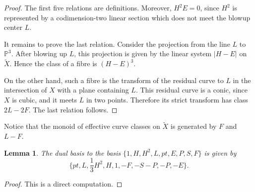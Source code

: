 \documentclass[10pt,a4paper]{amsart}
\newtheorem{lemma}[theorem]{Lemma}
\numberwithin{equation}{section}
\renewcommand{\P}{\mathbb P}
\begin{document}
\begin{proof}
The first five relations are definitions. Moreover, $H^2E=0$, since $H^2$
is represented by a codimension-two linear section which does not meet the
blowup center $L$.

It remains to prove the last relation. Consider the projection from the line
$L$ to $\P^3$. After blowing up $L$, this projection is given by the
linear system $|H-E|$ on $\widetilde{X}$. Hence the class of a fibre is $(H-E)^3$.

On the other hand, such a fibre is the transform of the residual curve to
$L$ in the intersection of $X$ with a plane containing $L$. This residual
curve is a conic, since $X$ is cubic, and it meets $L$ in two points.
Therefore its strict transform has class $2L - 2F$. The last relation follows. 
\end{proof}

Notice that the monoid of effective curve classes on $\widetilde{X}$ is generated by $F$ and $L-F$. 

\begin{lemma}\label{lDualBasis}
The dual basis to the basis  $\{1,H,H^2,L,pt,E,P,S,F\}$ is given by
\[
\{ pt,L,\frac{1}{3}H^2,H,1,-F,-S-P,-P,-E\}. 
\]
\end{lemma}

\begin{proof}
This is a direct computation.
\end{proof}
\end{document}
